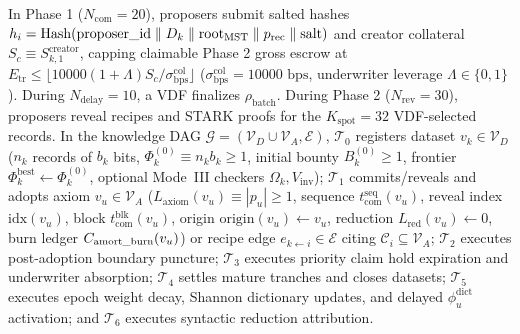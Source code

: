 \documentclass[runningheads,a4paper]{llncs}
\renewcommand{\_}{\textunderscore\allowbreak}
\begin{document}
In Phase 1 ($N_{\text{com}} = 20$), proposers submit salted hashes $h_i = \text{Hash}(\text{proposer\_id} \parallel D_k \parallel \text{root}_{\text{MST}} \parallel p_{\text{rec}} \parallel \text{salt})$ and creator collateral $S_c \equiv S_{k,1}^{\text{creator}}$, capping claimable Phase 2 gross escrow at $E_{\text{tr}} \le \lfloor 10000 (1 + \Lambda) S_c / \sigma_{\text{bps}}^{\text{col}} \rfloor$ ($\sigma_{\text{bps}}^{\text{col}} = 10000\text{ bps}$, underwriter leverage $\Lambda \in \{0,\allowbreak 1\}$). During $N_{\text{delay}} = 10$, a VDF \cite{boneh2018} finalizes $\rho_{\text{batch}}$. During Phase 2 ($N_{\text{rev}} = 30$), proposers reveal recipes and STARK proofs for the $K_{\text{spot}} = 32$ VDF-selected records.
In the knowledge DAG $\mathcal{G} = (\mathcal{V}_D \cup \mathcal{V}_A,\allowbreak \mathcal{E})$, $\mathcal{T}_0$ registers dataset $v_k \in \mathcal{V}_D$ ($n_k$ records of $b_k$ bits, $\Phi_k^{(0)} \equiv n_k b_k \ge 1$, initial bounty $B_k^{(0)} \ge 1$, frontier $\Phi_k^{\text{best}} \leftarrow \Phi_k^{(0)}$, optional Mode~III checkers $\Omega_k,\allowbreak V_{\text{inv}}$); $\mathcal{T}_1$ commits/reveals and adopts axiom $v_u \in \mathcal{V}_A$ ($L_{\text{axiom}}(v_u) \equiv |p_u| \ge 1$, sequence $t_{\text{com}}^{\text{seq}}(v_u)$, reveal index $\text{idx}(v_u)$, block $t_{\text{com}}^{\text{blk}}(v_u)$, origin $\text{origin}(v_u) \leftarrow v_u$, reduction $L_{\text{red}}(v_u) \leftarrow 0$, burn ledger $C_{\text{amort\_burn}}(v_u)$) or recipe edge $e_{k \leftarrow i} \in \mathcal{E}$ citing $\mathcal{C}_i \subseteq \mathcal{V}_A$; $\mathcal{T}_2$ executes post-adoption boundary puncture; $\mathcal{T}_3$ executes priority claim hold expiration and underwriter absorption; $\mathcal{T}_4$ settles mature tranches and closes datasets; $\mathcal{T}_5$ executes epoch weight decay, Shannon dictionary updates, and delayed $\phi_u^{\text{dict}}$ activation; and $\mathcal{T}_6$ executes syntactic reduction attribution.
\end{document}
